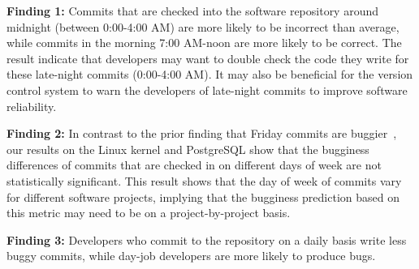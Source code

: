 \begin{list}{}{\topsep=0pt\parsep=0pt\leftmargin=9pt\itemindent=0pt}

\vspace{0.05in}
\item {\bf Finding 1:}
Commits that are checked into the software repository around midnight (between 0:00-4:00 AM) 
are more likely to be incorrect than average, while commits in the morning 7:00 AM-noon 
are more likely to be correct.
The result indicate that developers may want to double check the code they write for these 
late-night commits (0:00-4:00 AM).
It may also be beneficial for the version control
system to warn the developers of late-night commits to improve software reliability. 

\item {\bf Finding 2:}
In contrast to the prior finding that Friday commits are buggier~\cite{sliwerski-msr-2005}, 
our results on the Linux kernel and PostgreSQL show that 
the bugginess differences of commits that are checked in on different days of week 
are not statistically significant. This result shows that the day of week of commits
vary for different software projects, implying that the bugginess prediction based on this 
metric may need to be on a project-by-project basis.

\item {\bf Finding 3:}
Developers who commit to the repository on a daily basis
write less buggy commits, while day-job developers are more likely to produce
bugs.

\end{list}


